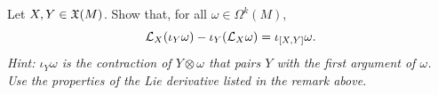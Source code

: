 \begin{exercise}
	Let $X,Y\in\mathfrak{X}(M)$. Show that, for all $\omega\in\Omega^k(M)$,
	\begin{equation}
		\mathcal{L}_X(\iota_Y\omega) - \iota_Y(\mathcal{L}_X\omega) = \iota_{[X,Y]}\omega.
	\end{equation}
	\textit{\small Hint: $\iota_Y\omega$ is the contraction of $Y\otimes\omega$ that pairs $Y$ with the first argument of $\omega$. Use the properties of the Lie derivative listed in the remark above.}
\end{exercise}
